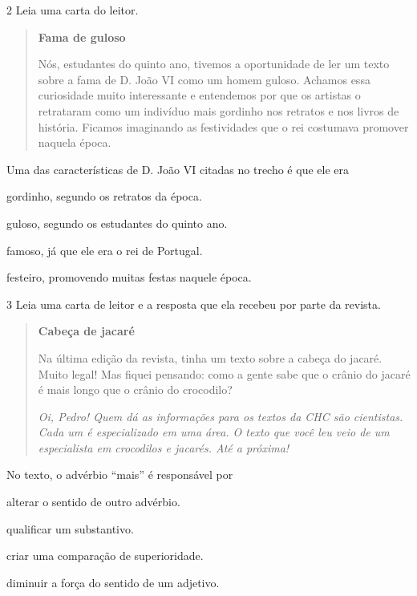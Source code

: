 \num{2} Leia uma carta do leitor.

\begin{quote}
\textbf{Fama de guloso}

Nós, estudantes do quinto ano, tivemos a oportunidade de ler um texto sobre a fama de D. João VI como um homem guloso. Achamos essa curiosidade muito interessante e entendemos por que os artistas o retrataram como um indivíduo mais gordinho nos retratos e nos livros de história. Ficamos imaginando as festividades que o rei costumava promover naquela época.

\end{quote}

Uma das características de D. João VI citadas no trecho é que ele era

\begin{escolha}[itemsep=-5pt]
\item gordinho, segundo os retratos da época.

\item guloso, segundo os estudantes do quinto ano.

\item famoso, já que ele era o rei de Portugal.

\item festeiro, promovendo muitas festas naquele época.
\end{escolha}



\num{3} Leia uma carta de leitor e a resposta que ela recebeu por parte da revista.

\begin{quote}
\textbf{Cabeça de jacaré}

Na última edição da revista, tinha um texto sobre a cabeça do jacaré.
Muito legal! Mas fiquei pensando: como a gente sabe que o crânio do jacaré
é mais longo que o crânio do crocodilo?

\textit{Oi, Pedro! Quem dá as informações para os textos da CHC são cientistas.
Cada um é especializado em uma área. O texto que você leu veio de um
especialista em crocodilos e jacarés. Até a próxima!}

\end{quote}

No texto, o advérbio ``mais'' é responsável por

\begin{escolha}[itemsep=-5pt]
\item alterar o sentido de outro advérbio.

\item qualificar um substantivo.

\item criar uma comparação de superioridade.

\item diminuir a força do sentido de um adjetivo.
\end{escolha}


